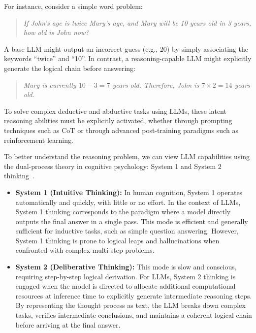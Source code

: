 For instance, consider a simple word problem:

\begin{quote}
\textit{If John's age is twice Mary's age, and Mary will be 10 years old in 3 years, how old is John now?}
\end{quote}

A base LLM might output an incorrect guess (e.g., 20) by simply associating the keywords ``twice'' and ``10''. In contrast, a reasoning-capable LLM might explicitly generate the logical chain before answering:

\begin{quote}
\textit{Mary is currently $10 - 3 = 7$ years old. Therefore, John is $7 \times 2 = 14$ years old.}
\end{quote}

To solve complex deductive and abductive tasks using LLMs, these latent reasoning abilities must be explicitly activated, whether through prompting techniques such as CoT or through advanced post-training paradigms such as reinforcement learning.

To better understand the reasoning problem, we can view LLM capabilities using the dual-process theory in cognitive psychology: System 1 and System 2 thinking~\cite{kahneman:2011thinking}.

\begin{itemize}
\item \vspace{0.5cm} \textbf{System 1 (Intuitive Thinking):} In human cognition, System 1 operates automatically and quickly, with little or no effort. In the context of LLMs, System 1 thinking corresponds to the paradigm where a model directly outputs the final answer in a single pass. This mode is efficient and generally sufficient for inductive tasks, such as simple question answering. However, System 1 thinking is prone to logical leaps and hallucinations when confronted with complex multi-step problems.
\item \vspace{0.3cm} \textbf{System 2 (Deliberative Thinking):} This mode is slow and conscious, requiring step-by-step logical derivation. For LLMs, System 2 thinking is engaged when the model is directed to allocate additional computational resources at inference time to explicitly generate intermediate reasoning steps. By representing the thought process as text, the LLM breaks down complex tasks, verifies intermediate conclusions, and maintains a coherent logical chain before arriving at the final answer.
\end{itemize}
\vspace{0.3cm}

